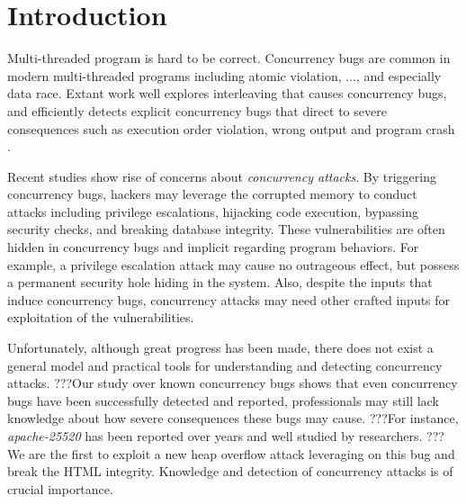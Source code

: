 \section{Introduction} \label{sec:intro}


Multi-threaded program is hard to be correct. 
Concurrency bugs are common in modern multi-threaded programs  
including atomic violation, ..., and especially data race\cite{lu:concurrency-bugs,conmem:asplos10,conseq:asplos11, lu:muvi:sosp}.
Extant work well explores interleaving that causes concurrency bugs, 
and efficiently detects explicit concurrency bugs that direct to  
severe consequences such as execution order violation, wrong output and program crash
\cite{wu2015:collaborative,tsan,valgrind:pldi,lu:muvi:sosp,conseq:asplos11,conmem:asplos10}.

Recent studies\cite{acidrain:sigmod17,con:hotpar12} show rise of concerns about \emph{concurrency attacks}.
By triggering concurrency bugs, 
hackers may leverage the corrupted memory to conduct  
attacks including privilege escalations\cite{uselib-bug-12791,mysql-bug-14747}, hijacking code execution\cite{berend-jan-wever-msiexploit}, bypassing security checks\cite{xwindows,theotheriphone,theotheriphone-2011}, 
and breaking database integrity\cite{acidrain:sigmod17}.
These vulnerabilities are often hidden in concurrency bugs and implicit regarding program behaviors. 
For example, a privilege escalation attack may cause no outrageous effect, 
but possess a permanent security hole hiding in the system.
Also, despite the inputs that induce concurrency bugs, 
concurrency attacks may need other crafted inputs for exploitation of the vulnerabilities. 



Unfortunately, although great progress has been made, there does not exist a general model and practical tools  
for understanding and detecting concurrency attacks.
???Our study over known concurrency 
bugs\cite{apache-bug-25520, apache-bug-46215} shows that 
even concurrency bugs have been successfully detected and reported, 
professionals may still lack knowledge about how severe consequences these bugs may cause. 
???For instance, \emph{apache-25520}\cite{apache-bug-25520} has been 
reported over years and well studied by researchers\cite{lu:concurrency-bugs}.  
???We are the first to exploit a new heap overflow attack leveraging on this bug and break the HTML integrity. 
Knowledge and detection of concurrency attacks is of crucial importance. 

